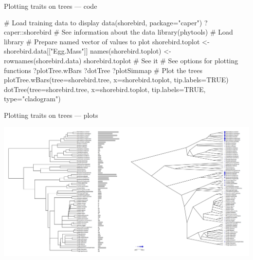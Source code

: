 \documentclass[compress, ucs, xelatex, 11pt, xcolor=svgnames, aspectratio=169,
	hyperref={
		bookmarks=true,
		unicode=true,
		colorlinks=true,
		pdftitle={Molecular data in R},
		plainpages=false,
		pdfauthor={Vojtech Zeisek},
		pdfsubject={Course about phylogeny and evolution in R},
		pdfcreator={XeLaTeX},
		pdfkeywords={R, evolution, phylogeny, molecular data},
		linkcolor=Crimson, %
		anchorcolor=Magenta, %
		citecolor=Magenta, %
		filecolor=Magenta, %
		menucolor=Magenta, %
		urlcolor=DodgerBlue, %
		pdftex},
	url={hyphens, lowtilde} %
	]{beamer}
\begin{document}
\begin{frame}[fragile]{Plotting traits on trees --- code}
	\begin{spluscode}
    # Load training data to display
    data(shorebird, package="caper")
    ?caper::shorebird # See information about the data
    library(phytools) # Load library
    # Prepare named vector of values to plot
    shorebird.toplot <- shorebird.data[["Egg.Mass"]]
    names(shorebird.toplot) <- rownames(shorebird.data)
    shorebird.toplot # See it
    # See options for plotting functions
    ?plotTree.wBars
    ?dotTree
    ?plotSimmap
    # Plot the trees
    plotTree.wBars(tree=shorebird.tree, x=shorebird.toplot,
      tip.labels=TRUE)
    dotTree(tree=shorebird.tree, x=shorebird.toplot, tip.labels=TRUE,
      type="cladogram")
	\end{spluscode}
\end{frame}

\begin{frame}{Plotting traits on trees --- plots}
	\begin{center}
		\includegraphics[width=\textwidth-2cm]{treeval.png}
	\end{center}
\end{frame}

%
%

\section{}
\end{document}
